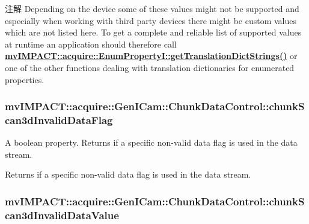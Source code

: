 \begin{DoxyNote}{注解}
Depending on the device some of these values might not be supported and especially when working with third party devices there might be custom values which are not listed here. To get a complete and reliable list of supported values at runtime an application should therefore call {\bfseries \hyperlink{classmv_i_m_p_a_c_t_1_1acquire_1_1_enum_property_i_a0ba6ccbf5ee69784d5d0b537924d26b6}{mv\+I\+M\+P\+A\+C\+T\+::acquire\+::\+Enum\+Property\+I\+::get\+Translation\+Dict\+Strings()}} or one of the other functions dealing with translation dictionaries for enumerated properties. 
\end{DoxyNote}
\hypertarget{classmv_i_m_p_a_c_t_1_1acquire_1_1_gen_i_cam_1_1_chunk_data_control_a60ad92001a22ff71b3e9241272d650d3}{
\subsubsection[{chunk\+Scan3d\+Invalid\+Data\+Flag}]{ mv\+I\+M\+P\+A\+C\+T\+::acquire\+::\+Gen\+I\+Cam\+::\+Chunk\+Data\+Control\+::chunk\+Scan3d\+Invalid\+Data\+Flag}}\label{classmv_i_m_p_a_c_t_1_1acquire_1_1_gen_i_cam_1_1_chunk_data_control_a60ad92001a22ff71b3e9241272d650d3}


A boolean property. Returns if a specific non-\/valid data flag is used in the data stream. 

Returns if a specific non-\/valid data flag is used in the data stream. \hypertarget{classmv_i_m_p_a_c_t_1_1acquire_1_1_gen_i_cam_1_1_chunk_data_control_a7006c4bc9dee316064885ebe3f6c0ae7}{
\subsubsection[{chunk\+Scan3d\+Invalid\+Data\+Value}]{ mv\+I\+M\+P\+A\+C\+T\+::acquire\+::\+Gen\+I\+Cam\+::\+Chunk\+Data\+Control\+::chunk\+Scan3d\+Invalid\+Data\+Value}}\label{classmv_i_m_p_a_c_t_1_1acquire_1_1_gen_i_cam_1_1_chunk_data_control_a7006c4bc9dee316064885ebe3f6c0ae7}


